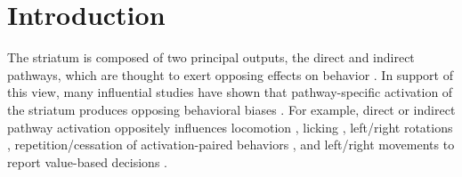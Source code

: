 \section{Introduction}
\label{sec:glmhmm:glmhmm-intro}

The striatum is composed of two principal outputs, the direct and indirect pathways, which are thought to exert opposing effects on behavior \cite{alexander_functional_1990}. In support of this view, many influential studies have shown that pathway-specific activation of the striatum produces opposing behavioral biases \cite{kravitz_regulation_2010, roseberry_cell-type-specific_2016, bartholomew_striatonigral_2016, bakhurin_opponent_2020, lobo_cell_2010, kravitz_distinct_2012,yttri_opponent_2016,tai_transient_2012,nonomura_monitoring_2018,lee_anatomically_2020,cui_asymmetrical_2021,tang_opposing_2021,parker_diametric_2018}. For example, direct or indirect pathway activation oppositely influences locomotion \cite{kravitz_regulation_2010,roseberry_cell-type-specific_2016,bartholomew_striatonigral_2016,parker_diametric_2018}, licking \cite{bakhurin_opponent_2020,lee_anatomically_2020,chen_direct_2021}, left/right rotations \cite{kravitz_regulation_2010,roseberry_cell-type-specific_2016,lee_anatomically_2020,lee_activation_2016}, repetition/cessation of activation-paired behaviors \cite{lobo_cell_2010,kravitz_distinct_2012,yttri_opponent_2016}, and left/right movements to report value-based decisions \cite{tai_transient_2012,tang_opposing_2021}.

